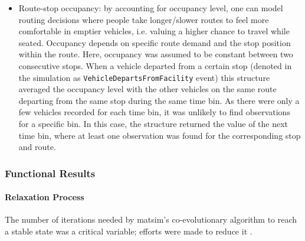 \begin{itemize}
%
\item Route-stop occupancy: by accounting for occupancy level, one can model routing decisions where people take longer/slower routes to feel more comfortable in emptier vehicles, i.e. valuing a higher chance to travel while seated. Occupancy depends on specific route demand and the stop position within the route. Here, occupancy was assumed to be constant between two consecutive stops. When a vehicle departed from a certain stop (denoted in the simulation as \lstinline|VehicleDepartsFromFacility| event) this structure averaged the occupancy level with the other vehicles on the same route departing from the same stop during the same time bin. As there were only a few vehicles  recorded for each time bin, it was unlikely to find observations for a specific bin. In this case, the structure returned the value of the next time bin, where at least one observation was found for the corresponding stop and route.
\end{itemize}

\subsubsection{Functional Results}
\paragraph{Relaxation Process}

The number of iterations needed by \gls{matsim}'s co-evolutionary algorithm to reach a stable state was a critical variable; efforts were made to reduce it \citep{MeisterEtAl_STRC_2006, FourieEtAl_TRB_2013}.

